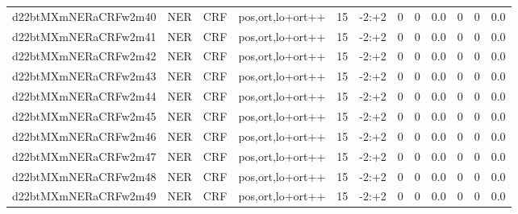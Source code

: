 \documentclass[a4paper]{article}
\begin{document}
\begin{landscape}
\begin{center}
\begin{tabular}{ |c|c|c|c|c|c|c|c|c|c|c|c|}
 
 	
 	\small{ d22btMXmNERaCRFw2m40 } & \small{ NER} & \small{  CRF }  & pos,ort,lo+ort++  &  15 &  \small{  -2:+2 }  &  0 & 0 & 0.0  &  0 & 0 & 0.0 \\
 	

 
 	
 	\small{ d22btMXmNERaCRFw2m41 } & \small{ NER} & \small{  CRF }  & pos,ort,lo+ort++  &  15 &  \small{  -2:+2 }  &  0 & 0 & 0.0  &  0 & 0 & 0.0 \\
 	

 
 	
 	\small{ d22btMXmNERaCRFw2m42 } & \small{ NER} & \small{  CRF }  & pos,ort,lo+ort++  &  15 &  \small{  -2:+2 }  &  0 & 0 & 0.0  &  0 & 0 & 0.0 \\
 	

 
 	
 	\small{ d22btMXmNERaCRFw2m43 } & \small{ NER} & \small{  CRF }  & pos,ort,lo+ort++  &  15 &  \small{  -2:+2 }  &  0 & 0 & 0.0  &  0 & 0 & 0.0 \\
 	

 
 	
 	\small{ d22btMXmNERaCRFw2m44 } & \small{ NER} & \small{  CRF }  & pos,ort,lo+ort++  &  15 &  \small{  -2:+2 }  &  0 & 0 & 0.0  &  0 & 0 & 0.0 \\
 	

 
 	
 	\small{ d22btMXmNERaCRFw2m45 } & \small{ NER} & \small{  CRF }  & pos,ort,lo+ort++  &  15 &  \small{  -2:+2 }  &  0 & 0 & 0.0  &  0 & 0 & 0.0 \\
 	

 
 	
 	\small{ d22btMXmNERaCRFw2m46 } & \small{ NER} & \small{  CRF }  & pos,ort,lo+ort++  &  15 &  \small{  -2:+2 }  &  0 & 0 & 0.0  &  0 & 0 & 0.0 \\
 	

 
 	
 	\small{ d22btMXmNERaCRFw2m47 } & \small{ NER} & \small{  CRF }  & pos,ort,lo+ort++  &  15 &  \small{  -2:+2 }  &  0 & 0 & 0.0  &  0 & 0 & 0.0 \\
 	

 
 	
 	\small{ d22btMXmNERaCRFw2m48 } & \small{ NER} & \small{  CRF }  & pos,ort,lo+ort++  &  15 &  \small{  -2:+2 }  &  0 & 0 & 0.0  &  0 & 0 & 0.0 \\
 	

 
 	
 	\small{ d22btMXmNERaCRFw2m49 } & \small{ NER} & \small{  CRF }  & pos,ort,lo+ort++  &  15 &  \small{  -2:+2 }  &  0 & 0 & 0.0  &  0 & 0 & 0.0 \\
 	


\end{tabular}
\end{center}
\end{landscape}
\end{document}
